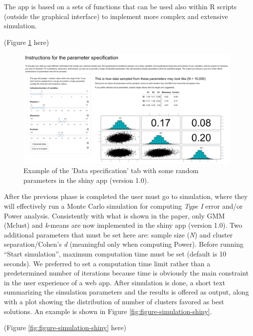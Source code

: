 \documentclass[
  man,floatsintext]{apa7}
\begin{document}
The app is based on a sets of functions that can be used also within R scripts (outside the graphical interface) to implement more complex and extensive simulation.

(Figure \ref{fig:figure-data-specification-shiny} here)

\begin{figure}

{\centering \includegraphics[width=1\linewidth]{figures_external/Figure_Data_specification_shiny} 

}

\caption{Example of the 'Data specification' tab with some random parameters in the shiny app (version 1.0).}\label{fig:figure-data-specification-shiny}
\end{figure}

After the previous phase is completed the user must go to simulation, where they will effectively run a Monte Carlo simulation for computing \emph{Type I} error and/or Power analysis. Consistently with what is shown in the paper, only GMM (Mclust) and \emph{k}-means are now implemented in the shiny app (version 1.0). Two additional parameters that must be set here are: sample size (\emph{N}) and cluster separation/Cohen's \emph{d} (meaningful only when computing Power). Before running ``Start simulation'', maximum computation time must be set (default is 10 seconds). We preferred to set a computation time limit rather than a predetermined number of iterations because time is obviously the main constraint in the user experience of a web app. After simulation is done, a short text summarizing the simulation parameters and the results is offered as output, along with a plot showing the distribution of number of clusters favored as best solutions. An example is shown in Figure \ref{fig:figure-simulation-shiny}.

(Figure \ref{fig:figure-simulation-shiny} here)
\end{document}
